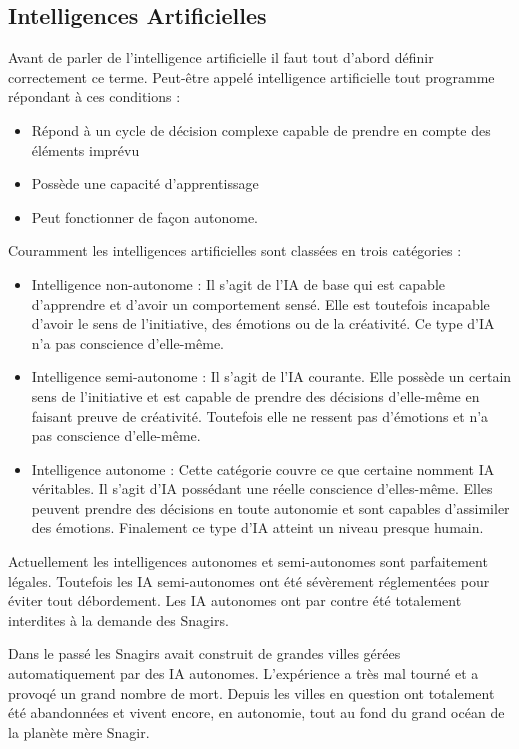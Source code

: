 \begin{multicols}{2}

\subsection{Intelligences Artificielles}

Avant de parler de l’intelligence artificielle il faut tout d’abord définir correctement ce terme. Peut-être appelé intelligence artificielle tout programme répondant à ces conditions :
\begin{itemize}
	\item Répond à un cycle de décision complexe capable de prendre en compte des éléments imprévu
	\item Possède une capacité d’apprentissage
	\item Peut fonctionner de façon autonome.
\end{itemize}

Couramment les intelligences artificielles sont classées en trois catégories :
\begin{itemize}
	\item Intelligence non-autonome : Il s’agit de l’IA de base qui est capable d’apprendre et d’avoir un comportement sensé. Elle est toutefois incapable d’avoir le sens de l’initiative, des émotions ou de la créativité. Ce type d’IA n’a pas conscience d'elle-même.
	\item Intelligence semi-autonome : Il s’agit de l’IA courante. Elle possède un certain sens de l’initiative et est capable de prendre des décisions d’elle-même en faisant preuve de créativité. Toutefois elle ne ressent pas d’émotions et n’a pas conscience d’elle-même.
	\item Intelligence autonome : Cette catégorie couvre ce que certaine nomment IA véritables. Il s’agit d’IA possédant une réelle conscience d’elles-même. Elles peuvent prendre des décisions en toute autonomie et sont capables d’assimiler des émotions. Finalement ce type d’IA atteint un niveau presque humain.
\end{itemize}

Actuellement les intelligences autonomes et semi-autonomes sont parfaitement légales. Toutefois les IA semi-autonomes ont été sévèrement réglementées pour éviter tout débordement. Les IA autonomes ont par contre été totalement interdites à la demande des Snagirs. 

Dans le passé les Snagirs avait construit de grandes villes gérées automatiquement par des IA autonomes. L’expérience a très mal tourné et a provoqé un grand nombre de mort. Depuis les villes en question ont totalement été abandonnées et vivent encore, en autonomie, tout au fond du grand océan de la planète mère Snagir.


\end{multicols}
